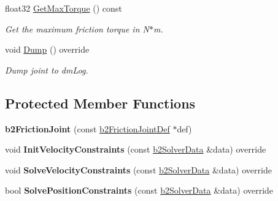 \begin{DoxyCompactItemize}
float32 \mbox{\hyperlink{classb2FrictionJoint_ae926972faa5846436cbcfe5772adc1f6}{Get\+Max\+Torque}} () const
\begin{DoxyCompactList}\small\item\em Get the maximum friction torque in N$\ast$m. \end{DoxyCompactList}\item 
\mbox{\label{classb2FrictionJoint_a934a3ce5bda09bc07111c1dd4e192406}} 
void \mbox{\hyperlink{classb2FrictionJoint_a934a3ce5bda09bc07111c1dd4e192406}{Dump}} () override
\begin{DoxyCompactList}\small\item\em Dump joint to dm\+Log. \end{DoxyCompactList}\end{DoxyCompactItemize}
\subsection*{Protected Member Functions}
\begin{DoxyCompactItemize}
\item 
\mbox{\label{classb2FrictionJoint_a7413c5f289257f0e993b7e750fe95b99}} 
{\bfseries b2\+Friction\+Joint} (const \mbox{\hyperlink{structb2FrictionJointDef}{b2\+Friction\+Joint\+Def}} $\ast$def)
\item 
\mbox{\label{classb2FrictionJoint_afce4006666e83c50d2017b5ff5e7ca2d}} 
void {\bfseries Init\+Velocity\+Constraints} (const \mbox{\hyperlink{structb2SolverData}{b2\+Solver\+Data}} \&data) override
\item 
\mbox{\label{classb2FrictionJoint_a49109c1785d949e99a809a8c297abf13}} 
void {\bfseries Solve\+Velocity\+Constraints} (const \mbox{\hyperlink{structb2SolverData}{b2\+Solver\+Data}} \&data) override
\item 
\mbox{\label{classb2FrictionJoint_a4e4b64b634299136bc2c7096d5c28aa8}} 
bool {\bfseries Solve\+Position\+Constraints} (const \mbox{\hyperlink{structb2SolverData}{b2\+Solver\+Data}} \&data) override
\end{DoxyCompactItemize}
